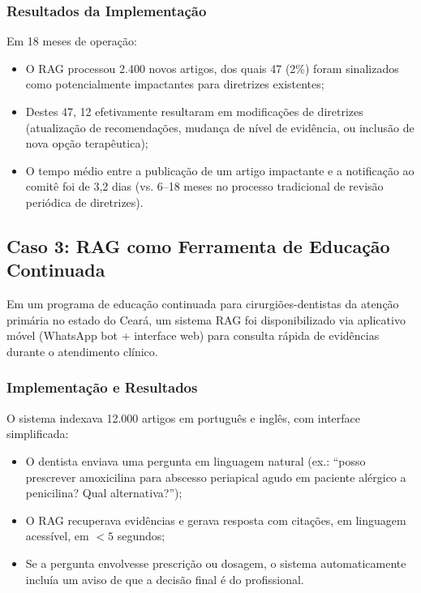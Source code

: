 \subsubsection{Resultados da Implementação}

Em 18 meses de operação:
\begin{itemize}
    \item O RAG processou 2.400 novos artigos, dos quais 47 (2\%) foram sinalizados como potencialmente impactantes para diretrizes existentes;
    \item Destes 47, 12 efetivamente resultaram em modificações de diretrizes (atualização de recomendações, mudança de nível de evidência, ou inclusão de nova opção terapêutica);
    \item O tempo médio entre a publicação de um artigo impactante e a notificação ao comitê foi de 3,2 dias (vs. 6--18 meses no processo tradicional de revisão periódica de diretrizes).
\end{itemize}


\subsection{Caso 3: RAG como Ferramenta de Educação Continuada}

Em um programa de educação continuada para cirurgiões-dentistas da atenção primária no estado do Ceará, um sistema RAG foi disponibilizado via aplicativo móvel (WhatsApp bot + interface web) para consulta rápida de evidências durante o atendimento clínico.

\subsubsection{Implementação e Resultados}

O sistema indexava 12.000 artigos em português e inglês, com interface simplificada:
\begin{itemize}
    \item O dentista enviava uma pergunta em linguagem natural (ex.: ``posso prescrever amoxicilina para abscesso periapical agudo em paciente alérgico a penicilina? Qual alternativa?'');\item O RAG recuperava evidências e gerava resposta com citações, em linguagem acessível, em $<5$ segundos;
    \item Se a pergunta envolvesse prescrição ou dosagem, o sistema automaticamente incluía um aviso de que a decisão final é do profissional.
\end{itemize}

